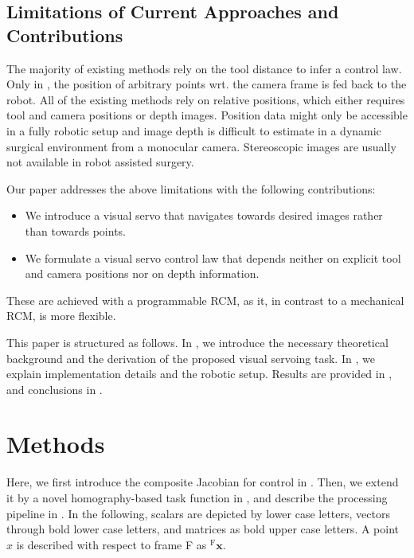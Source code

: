 
\subsection{Limitations of Current Approaches and Contributions}
The majority of existing methods rely on the tool distance to infer a control law. Only in \cite{ma2019autonomous, ma2020visual, aghakhani2013task, yang2019adaptive, li2020accelerated, osa2010framework}, the position of arbitrary points wrt. the camera frame is fed back to the robot. All of the existing methods rely on relative positions, which either requires tool and camera positions or depth images. Position data might only be accessible in a fully robotic setup and image depth is difficult to estimate in a dynamic surgical environment from a monocular camera. Stereoscopic images are usually not available in robot assisted surgery.

Our paper addresses the above limitations with the following contributions:
\begin{itemize}
    \item We introduce a visual servo that navigates towards desired images rather than towards points.
    \item We formulate a visual servo control law that depends neither on explicit tool and camera positions nor on depth information.
\end{itemize} 
These are achieved with a programmable RCM, as it, in contrast to a mechanical RCM, is more flexible. 

This paper is structured as follows. In , we introduce the necessary theoretical background and the derivation of the proposed visual servoing task. In , we explain implementation details and the robotic setup. Results are provided in , and conclusions in .

\section{Methods}
\label{c2:sec:methods}
Here, we first introduce the composite Jacobian for control in . Then, we extend it by a novel homography-based task function in , and describe the processing pipeline in . In the following, scalars are depicted by lower case letters, vectors through bold lower case letters, and matrices as bold upper case letters. A point $x$ is described with respect to frame F as $^\text{F}\mathbf{x}$.

